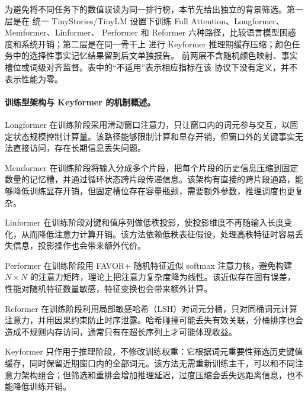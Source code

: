 \documentclass[letterpaper]{article}
\begin{document}
为避免将不同任务下的数值误读为同一排行榜，本节先给出独立的背景筛选。第一层是在
统一 TinyStories/TinyLM 设置下训练 Full Attention、Longformer、Memformer、Linformer、
Performer 和 Reformer 六种路径\cite{beltagy2020longformer,memformer2020,linformer2020,
performer2021,reformer2020}，比较语言模型困惑度和系统开销；第二层是在同一骨干上
进行 Keyformer 推理期缓存压缩；颜色任务中的选择性事实记忆结果留到后文单独报告。
前两层不含随机颜色映射、事实槽位或词级对齐监督。表中的“不适用”表示相应指标在该
协议下没有定义，并不表示性能为零。

\paragraph{训练型架构与 Keyformer 的机制概述。}
Longformer\cite{beltagy2020longformer} 在训练阶段采用滑动窗口注意力，只让窗口内的词元参与交互，以固定状态规模控制计算量。该路径能够限制计算和显存开销，但窗口外的关键事实无法直接访问，存在长期信息丢失问题。

Memformer\cite{memformer2020} 在训练阶段将输入分成多个片段，把每个片段的历史信息压缩到固定数量的记忆槽，并通过循环状态跨片段传递信息。该架构有直接的跨片段通路，能够降低训练显存开销，但固定槽位存在容量瓶颈，需要额外参数，推理调度也更复杂。

Linformer\cite{linformer2020} 在训练阶段对键和值序列做低秩投影，使投影维度不再随输入长度变化，从而降低注意力计算开销。该方法依赖低秩表征假设，处理高秩特征时容易丢失信息，投影操作也会带来额外代价。

Performer\cite{performer2021} 在训练阶段用 FAVOR+ 随机特征近似 softmax 注意力核，避免构建 $N\times N$ 的注意力矩阵，理论上把注意力复杂度降为线性。该近似存在固有误差，性能对随机特征数量敏感，特征变换也会带来额外计算。

Reformer\cite{reformer2020} 在训练阶段利用局部敏感哈希（LSH）对词元分桶，只对同桶词元计算注意力，并用因果约束防止时序泄露。哈希碰撞可能丢失有效关联，分桶排序也会造成不规则内存访问，通常只有在超长序列上才可能体现收益。

Keyformer 只作用于推理阶段，不修改训练权重：它根据词元重要性筛选历史键值缓存，同时保留近期窗口内的全部词元。该方法无需重新训练主干，可以和不同注意力架构组合；但筛选和重排会增加推理延迟，过度压缩会丢失远距离信息，也不能降低训练开销。
\end{document}
